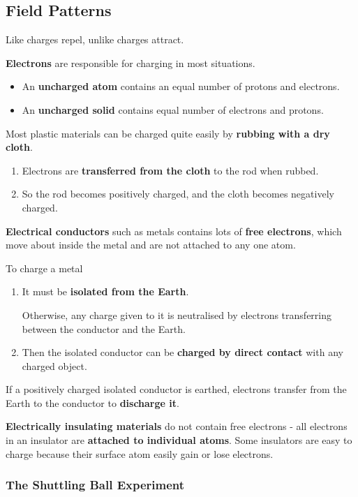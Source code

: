 \subsection{Field Patterns}

Like charges repel, unlike charges attract.

\textbf{Electrons} are responsible for charging in most situations.
\begin{itemize}
    \item An \textbf{uncharged atom} contains an equal number of protons and electrons.
    \item An \textbf{uncharged solid} contains equal number of electrons and protons.
\end{itemize}

Most plastic materials can be charged quite easily by \textbf{rubbing with a dry cloth}.
\begin{enumerate}
    \item Electrons are \textbf{transferred from the cloth} to the rod when rubbed.
    \item So the rod becomes positively charged, and the cloth becomes negatively charged.
\end{enumerate}

\textbf{Electrical conductors} such as metals contains lots of \textbf{free electrons}, which move about inside the metal and are not attached to any one atom.

To charge a metal
\begin{enumerate}
    \item It must be \textbf{isolated from the Earth}.

        Otherwise, any charge given to it is neutralised by electrons transferring between the conductor and the Earth.
    \item Then the isolated conductor can be \textbf{charged by direct contact} with any charged object.
\end{enumerate}

If a positively charged isolated conductor is earthed, electrons transfer from the Earth to the conductor to \textbf{discharge it}.

\textbf{Electrically insulating materials} do not contain free electrons - all electrons in an insulator are \textbf{attached to individual atoms}. Some insulators are easy to charge because their surface atom easily gain or lose electrons.

\subsubsection*{The Shuttling Ball Experiment}


